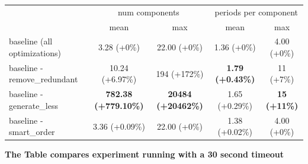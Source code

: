 	
\begin{tabular}{l c c c c}
	\toprule
	& \multicolumn{2}{c}{num components} & \multicolumn{2}{c}{periods per component} \\
	\cmidrule(lr){2-3} \cmidrule(lr){4-5}
	& mean & max & mean & max \\
	\midrule
	baseline (all optimizations)    &  3.28 (+0\%) &  22.00 (+0\%) & 1.36 (+0\%) &  4.00 (+0\%) \\
	baseline - remove\_redundant & 10.24 (+6.97\%) & 194 (+172\%)& \textbf{1.79 (+0.43\%)} & 11 (+7\%) \\
	baseline - generate\_less    &\textbf{782.38 (+779.10\%)}&\textbf{20484 (+20462\%)}&1.65 (+0.29\%)& \textbf{15 (+11\%)} \\
	baseline - smart\_order      &  3.36 (+0.09\%) &  22.00 (+0\%) & 1.38 (+0.02\%) &  4.00 (+0\%) \\
	\bottomrule
\end{tabular}
\textbf{The Table compares experiment running with a 30 second timeout}

\newpage
